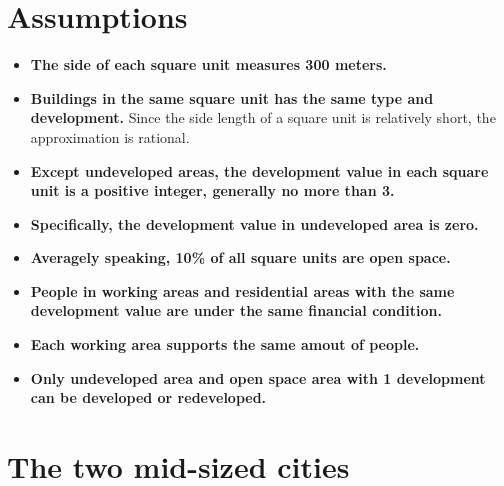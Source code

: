 
\section{Assumptions}
\begin{itemize}
  \item \textbf{The side of each square unit measures 300 meters.}
  \item \textbf{Buildings in the same square unit has the same type and development.} Since the side length of a square unit is relatively short, the approximation is rational.
  \item \textbf{Except undeveloped areas, the development value in each square unit is a positive integer, generally no more than 3.}
  \item \textbf{Specifically, the development value in undeveloped area is zero.}
  \item \textbf{Averagely speaking, 10\% of all square units are open space.}
  \item \textbf{People in working areas and residential areas with the same development value are under the same financial condition.}
  \item \textbf{Each working area supports the same amout of people.}
  \item \textbf{Only undeveloped area and open space area with 1 development can be developed or redeveloped.}
\end{itemize}


\section{The two mid-sized cities}
